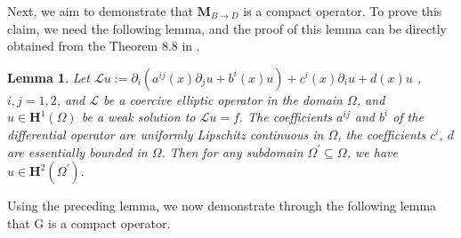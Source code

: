 \documentclass[11pt,reqno,twoside]{amsart}
\newtheorem{lem}{Lemma}[section]
\theoremstyle{definition}
\theoremstyle{remark}
\numberwithin{equation}{section}
\begin{document}
Next, we aim to demonstrate that $\mathbf M_{B \to D}$ is a compact operator. To prove this claim, we need the following lemma, and the proof of this lemma can be directly obtained from the Theorem 8.8 in \cite{GT01}.
\begin{lem}\label{ElliptRegular}
Let $\mathcal L u:= \partial _i \left( a^{ij} \left( x \right) \partial_j u +b^i \left( x \right) u\right) +c^i \left( x \right) \partial_i u+ d\left( x \right) u$ , $i,j=1,2$, and $\mathcal L$ be a coercive elliptic operator in the domain $\Omega$, and $u\in \mathbf H^1 \left( \Omega\right)$ be a weak solution to $\mathcal L u=f $. The coefficients $a^{ij}$ and $b^{i}$ of the differential operator are uniformly Lipschitz continuous in $\Omega$, the coefficients $c^{i}$, $d$ are essentially bounded in $\Omega$. Then for any subdomain $\Omega^{'} \subseteq \Omega$, we have $u\in \mathbf H^2 \left( \Omega^{'}\right) $.
\end{lem}
Using the preceding lemma, we now demonstrate through the following lemma that G is a compact operator.
\end{document}
